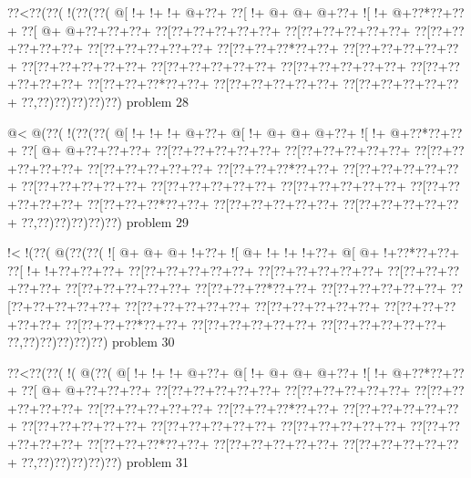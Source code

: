 \vbox{\vbox{\goo
\0??<\0??(\0??(\- !(\0??(\0??(
\- @[\- !+\- !+\- !+\- @+\0??+
\0??[\- !+\- @+\- @+\- @+\0??+
\- ![\- !+\- @+\0??*\0??+\0??+
\0??[\- @+\- @+\0??+\0??+\0??+
\0??[\0??+\0??+\0??+\0??+\0??+
\0??[\0??+\0??+\0??+\0??+\0??+
\0??[\0??+\0??+\0??+\0??+\0??+
\0??[\0??+\0??+\0??+\0??+\0??+
\0??[\0??+\0??+\0??*\0??+\0??+
\0??[\0??+\0??+\0??+\0??+\0??+
\0??[\0??+\0??+\0??+\0??+\0??+
\0??[\0??+\0??+\0??+\0??+\0??+
\0??[\0??+\0??+\0??+\0??+\0??+
\0??[\0??+\0??+\0??+\0??+\0??+
\0??[\0??+\0??+\0??*\0??+\0??+
\0??[\0??+\0??+\0??+\0??+\0??+
\0??[\0??+\0??+\0??+\0??+\0??+
\0??,\0??)\0??)\0??)\0??)\0??)
}
\hfil problem 28\hfil\break
}

\vbox{\vbox{\goo
\- @<\- @(\0??(\- !(\0??(\0??(
\- @[\- !+\- !+\- !+\- @+\0??+
\- @[\- !+\- @+\- @+\- @+\0??+
\- ![\- !+\- @+\0??*\0??+\0??+
\0??[\- @+\- @+\0??+\0??+\0??+
\0??[\0??+\0??+\0??+\0??+\0??+
\0??[\0??+\0??+\0??+\0??+\0??+
\0??[\0??+\0??+\0??+\0??+\0??+
\0??[\0??+\0??+\0??+\0??+\0??+
\0??[\0??+\0??+\0??*\0??+\0??+
\0??[\0??+\0??+\0??+\0??+\0??+
\0??[\0??+\0??+\0??+\0??+\0??+
\0??[\0??+\0??+\0??+\0??+\0??+
\0??[\0??+\0??+\0??+\0??+\0??+
\0??[\0??+\0??+\0??+\0??+\0??+
\0??[\0??+\0??+\0??*\0??+\0??+
\0??[\0??+\0??+\0??+\0??+\0??+
\0??[\0??+\0??+\0??+\0??+\0??+
\0??,\0??)\0??)\0??)\0??)\0??)
}
\hfil problem 29\hfil\break
}

\vbox{\vbox{\goo
\- !<\- !(\0??(\- @(\0??(\0??(
\- ![\- @+\- @+\- @+\- !+\0??+
\- ![\- @+\- !+\- !+\- !+\0??+
\- @[\- @+\- !+\0??*\0??+\0??+
\0??[\- !+\- !+\0??+\0??+\0??+
\0??[\0??+\0??+\0??+\0??+\0??+
\0??[\0??+\0??+\0??+\0??+\0??+
\0??[\0??+\0??+\0??+\0??+\0??+
\0??[\0??+\0??+\0??+\0??+\0??+
\0??[\0??+\0??+\0??*\0??+\0??+
\0??[\0??+\0??+\0??+\0??+\0??+
\0??[\0??+\0??+\0??+\0??+\0??+
\0??[\0??+\0??+\0??+\0??+\0??+
\0??[\0??+\0??+\0??+\0??+\0??+
\0??[\0??+\0??+\0??+\0??+\0??+
\0??[\0??+\0??+\0??*\0??+\0??+
\0??[\0??+\0??+\0??+\0??+\0??+
\0??[\0??+\0??+\0??+\0??+\0??+
\0??,\0??)\0??)\0??)\0??)\0??)
}
\hfil problem 30\hfil\break
}

\vbox{\vbox{\goo
\0??<\0??(\0??(\- !(\- @(\0??(
\- @[\- !+\- !+\- !+\- @+\0??+
\- @[\- !+\- @+\- @+\- @+\0??+
\- ![\- !+\- @+\0??*\0??+\0??+
\0??[\- @+\- @+\0??+\0??+\0??+
\0??[\0??+\0??+\0??+\0??+\0??+
\0??[\0??+\0??+\0??+\0??+\0??+
\0??[\0??+\0??+\0??+\0??+\0??+
\0??[\0??+\0??+\0??+\0??+\0??+
\0??[\0??+\0??+\0??*\0??+\0??+
\0??[\0??+\0??+\0??+\0??+\0??+
\0??[\0??+\0??+\0??+\0??+\0??+
\0??[\0??+\0??+\0??+\0??+\0??+
\0??[\0??+\0??+\0??+\0??+\0??+
\0??[\0??+\0??+\0??+\0??+\0??+
\0??[\0??+\0??+\0??*\0??+\0??+
\0??[\0??+\0??+\0??+\0??+\0??+
\0??[\0??+\0??+\0??+\0??+\0??+
\0??,\0??)\0??)\0??)\0??)\0??)
}
\hfil problem 31\hfil\break
}

